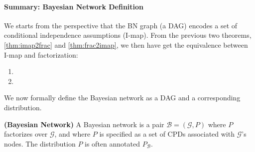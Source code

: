 \documentclass{article}
\newcommand{\bfs}[1]{\textbf{({#1}) }}
\begin{document}
\paragraph{Summary: Bayesian Network Definition}
We starts from the perspective that the BN graph (a DAG) encodes a set of conditional independence assumptions (I-map).
From the previous two theorems,\cref{thm:imap2frac} and \cref{thm:frac2imap}, we then have get the equivalence between I-map and factorization: 
\begin{enumerate}
    \item {}
    \item {}
\end{enumerate}
We now formally define the Bayesian network as a DAG and a corresponding distribution. 
\begin{defa}\bfs{Bayesian Network}
A Bayesian network is a pair $\mathcal{B}=(\mathcal{G}, P)$ where $P$ factorizes over $\mathcal{G}$, and where $P$ is specified as a set of CPDs associated with $\mathcal{G}$'s nodes. The distribution $P$ is often annotated $P_{\mathcal{B}}$.
\end{defa}
\end{document}
